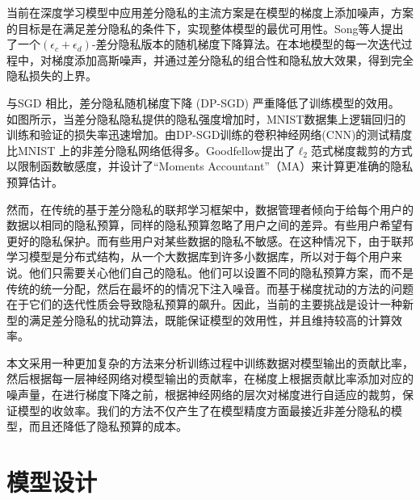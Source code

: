 当前在深度学习模型中应用差分隐私的主流方案是在模型的梯度上添加噪声，方案的目标是在满足差分隐私的条件下，实现整体模型的最优可用性。Song等人提出了一个$\left(\epsilon_{c}+\epsilon_{d}\right)$-差分隐私版本的随机梯度下降算法。在本地模型的每一次迭代过程中，对梯度添加高斯噪声，并通过差分隐私的组合性和隐私放大效果，得到完全隐私损失的上界。

与SGD 相比，差分隐私随机梯度下降 (DP-SGD) 严重降低了训练模型的效用。 如图所示，当差分隐私隐私提供的隐私强度增加时，MNIST数据集上逻辑回归的训练和验证的损失率迅速增加。由DP-SGD训练的卷积神经网络(CNN)的测试精度比MNIST 上的非差分隐私网络低得多。Goodfellow提出了$\ell_{2}$范式梯度裁剪的方式以限制函数敏感度，并设计了“Moments Accountant”（MA）来计算更准确的隐私预算估计。

然而，在传统的基于差分隐私的联邦学习框架中，数据管理者倾向于给每个用户的数据以相同的隐私预算，同样的隐私预算忽略了用户之间的差异。有些用户希望有更好的隐私保护。而有些用户对某些数据的隐私不敏感。在这种情况下，由于联邦学习模型是分布式结构，从一个大数据库到许多小数据库，所以对于每个用户来说。他们只需要关心他们自己的隐私。他们可以设置不同的隐私预算方案，而不是传统的统一分配，然后在最坏的的情况下注入噪音。而基于梯度扰动的方法的问题在于它们的迭代性质会导致隐私预算的飙升。因此，当前的主要挑战是设计一种新型的满足差分隐私的扰动算法，既能保证模型的效用性，并且维持较高的计算效率。

本文采用一种更加复杂的方法来分析训练过程中训练数据对模型输出的贡献比率，然后根据每一层神经网络对模型输出的贡献率，在梯度上根据贡献比率添加对应的噪声量，在进行梯度下降之前，根据神经网络的层次对梯度进行自适应的裁剪，保证模型的收敛率。我们的方法不仅产生了在模型精度方面最接近非差分隐私的模型，而且还降低了隐私预算的成本。

\section{模型设计}

